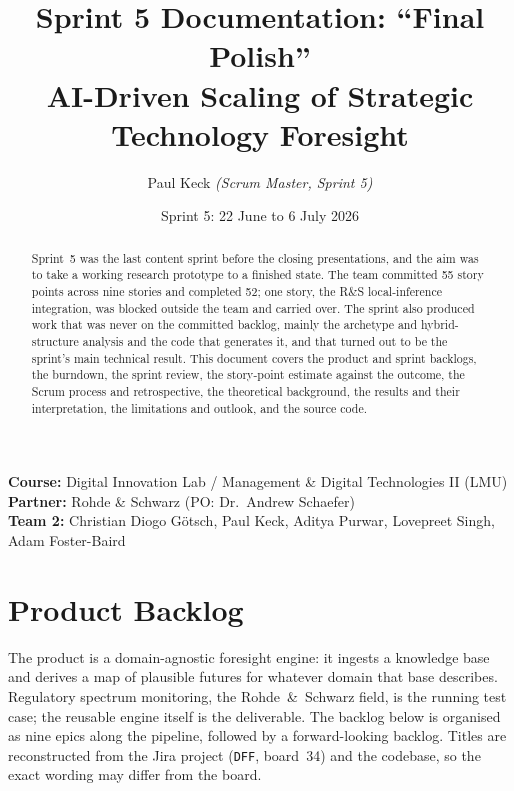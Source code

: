 \documentclass[11pt,a4paper]{article}
\title{\vspace{-1.2cm}\textbf{Sprint 5 Documentation: \enquote{Final Polish}}\\[4pt]
  \large AI-Driven Scaling of Strategic Technology Foresight}
\author{Paul Keck \quad\textit{(Scrum Master, Sprint 5)}}
\date{Sprint 5: 22 June to 6 July 2026}
\newcommand{\code}[1]{\texttt{\small #1}}
\begin{document}
\maketitle
\thispagestyle{plain}

\vspace{-4mm}
\begin{center}\small
\textbf{Course:} Digital Innovation Lab / Management \& Digital Technologies II (LMU) \quad\textbar\quad
\textbf{Partner:} Rohde \& Schwarz (PO: Dr.\ Andrew Schaefer)\\
\textbf{Team 2:} Christian Diogo Götsch, Paul Keck, Aditya Purwar, Lovepreet Singh, Adam Foster-Baird
\end{center}

\begin{abstract}
\noindent Sprint~5 was the last content sprint before the closing presentations, and the aim was to take a
working research prototype to a finished state. The team committed 55 story points across nine stories and
completed 52; one story, the R\&S local-inference integration, was blocked outside the team and carried
over. The sprint also produced work that was never on the committed backlog, mainly the archetype and
hybrid-structure analysis and the code that generates it, and that turned out to be the sprint's main
technical result. This document covers the product and sprint backlogs, the burndown, the sprint review, the
story-point estimate against the outcome, the Scrum process and retrospective, the theoretical background,
the results and their interpretation, the limitations and outlook, and the source code.
\end{abstract}

\tableofcontents
\vspace{3mm}

\section{Product Backlog}
The product is a domain-agnostic foresight engine: it ingests a knowledge base and derives a map of
plausible futures for whatever domain that base describes. Regulatory spectrum monitoring, the
Rohde~\&~Schwarz field, is the running test case; the reusable engine itself is the deliverable. The backlog
below is organised as nine epics along the pipeline, followed by a forward-looking backlog. Titles are
reconstructed from the Jira project (\code{DFF}, board~34) and the codebase, so the exact wording may differ
from the board.
\end{document}
